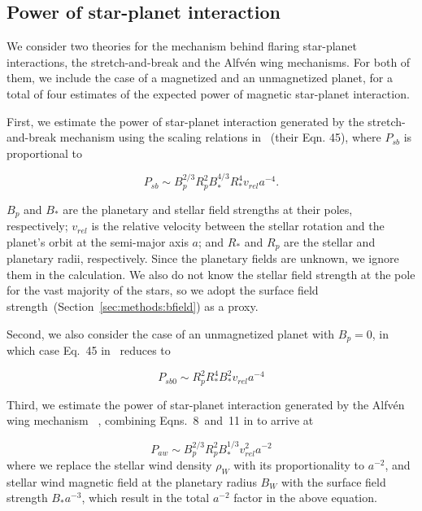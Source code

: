 \documentclass[twocolumn]{aastex631}
\begin{document}
\subsection{Power of star-planet interaction}
\label{sec:methods:pspi}
We consider two theories for the mechanism behind flaring star-planet interactions, the stretch-and-break and the Alfv\'en wing mechanisms. For both of them, we include the case of a magnetized and an unmagnetized planet, for a total of four estimates of the expected power of magnetic star-planet interaction.

First, we estimate the power of star-planet interaction generated by the stretch-and-break mechanism using the scaling relations in~\cite{lanza2012starplanet} (their Eqn. 45), where $P_{sb}$ is proportional to

\begin{equation}
    P_{sb} \sim B_p^{2/3} R_p^2 B_*^{4/3} R_*^4 v_{rel} a^{-4} .
\end{equation}

$B_p$ and $B_*$ are the planetary and stellar field strengths at their poles, respectively; $v_{rel}$ is the relative velocity between the stellar rotation and the planet's orbit at the semi-major axis $a$; and $R_*$ and $R_p$ are the stellar and planetary radii, respectively. Since the planetary fields are unknown, we ignore them in the calculation. We also do not know the stellar field strength at the pole for the vast majority of the stars, so we adopt the surface field strength~(Section~\ref{sec:methods:bfield}) as a proxy.

Second, we also consider the case of an unmagnetized planet with $B_p=0$, in which case Eq.~45 in~\cite{lanza2012starplanet} reduces to

\begin{equation}
    P_{sb0} \sim R_p^2 R_*^4 B_*^2 v_{rel}    a^{-4} 
\end{equation}

Third, we estimate the power of star-planet interaction generated by the Alfv\'en wing mechanism ~\citep{saur2013magnetic,kavanagh2022radio}, combining Eqns.~8~and~11 in \citet{kavanagh2022radio} to arrive at

\begin{equation}
    P_{aw} \sim B_p^{2/3} R_{p}^2    B_*^{1/3}  v_{rel}^2 a^{-2}  
\end{equation}
where we replace the stellar wind density $\rho_W$ with its proportionality to $a^{-2}$, and stellar wind magnetic field at the planetary radius $B_W$ with the surface field strength $B_* a^{-3}$, which result in the total $a^{-2}$ factor in the above equation.
\end{document}
